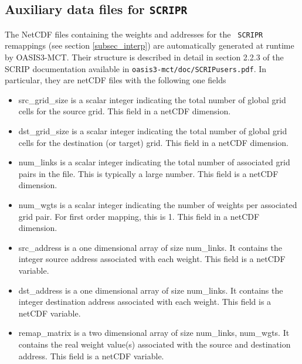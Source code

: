\subsection{Auxiliary data files for {\tt SCRIPR}}
\label{subsec_auxilscripr}

The NetCDF files containing the weights and addresses for the {\tt
  SCRIPR} remappings (see section \ref{subsec_interp})  are
  automatically generated at runtime by OASIS3-MCT. Their structure is
  described in detail in section 2.2.3 of the SCRIP documentation available
  in {\tt oasis3-mct/doc/SCRIPusers.pdf}.  In particular, they are netCDF
  files with the following one fields
\begin{itemize}
\item src\_grid\_size is a scalar integer indicating the total number of
  global grid cells for the source grid.  This field
  in a netCDF dimension.
\item dst\_grid\_size is a scalar integer indicating the total number of
  global grid cells for the destination (or target) grid.  This field
  in a netCDF dimension.
\item num\_links is a scalar integer indicating the total number of associated
  grid pairs in the file.  This is typically a large number.  This field
  is a netCDF dimension.
\item num\_wgts is a scalar integer indicating the number of weights per
  associated grid pair.  For first order mapping, this is 1.  This field
  in a netCDF dimension.
\item src\_address is a one dimensional array of size num\_links.  It contains
  the integer source address associated with each weight.  This field is a
  netCDF variable.
\item dst\_address is a one dimensional array of size num\_links.  It contains
  the integer destination address associated with each weight.  This field is a
  netCDF variable.
\item remap\_matrix is a two dimensional array of size num\_links, num\_wgts.  It contains
  the real weight value(s) associated with the source and destination address. 
  This field is a netCDF variable.
\end{itemize}

